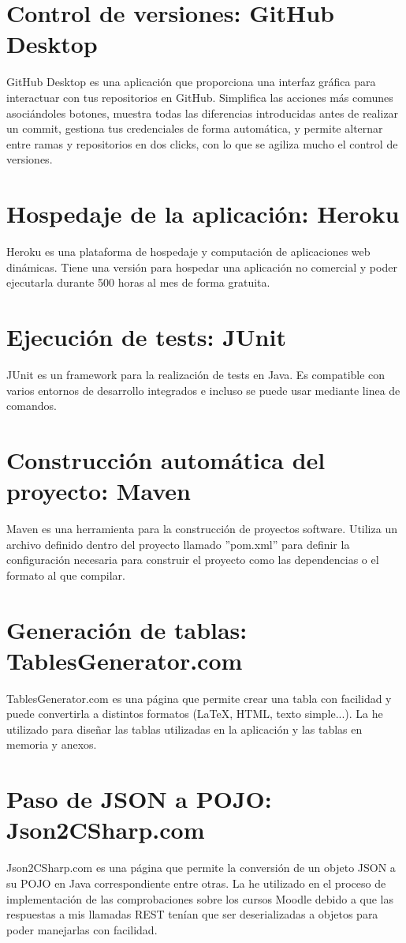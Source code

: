 \section{Control de versiones: GitHub Desktop}
GitHub Desktop es una aplicación que proporciona una interfaz gráfica para interactuar con tus repositorios en GitHub. Simplifica las acciones más comunes asociándoles botones, muestra todas las diferencias introducidas antes de realizar un commit, gestiona tus credenciales de forma automática, y permite alternar entre ramas y repositorios en dos clicks, con lo que se agiliza mucho el control de versiones.
\section{Hospedaje de la aplicación: Heroku}
Heroku es una plataforma de hospedaje y computación de aplicaciones web dinámicas. Tiene una versión para hospedar una aplicación no comercial y poder ejecutarla durante 500 horas al mes de forma gratuita.
\section{Ejecución de tests: JUnit}
JUnit es un framework para la realización de tests en Java. Es compatible con varios entornos de desarrollo integrados e incluso se puede usar mediante linea de comandos.
\section{Construcción automática del proyecto: Maven}
Maven es una herramienta para la construcción de proyectos software. Utiliza un archivo definido dentro del proyecto llamado ''pom.xml'' para definir la configuración necesaria para construir el proyecto como las dependencias o el formato al que compilar.
\section{Generación de tablas: TablesGenerator.com}
TablesGenerator.com es una página que permite crear una tabla con facilidad y puede convertirla a distintos formatos (LaTeX, HTML, texto simple...). La he utilizado para diseñar las tablas utilizadas en la aplicación y las tablas en memoria y anexos.
\section{Paso de JSON a POJO: Json2CSharp.com}
Json2CSharp.com es una página que permite la conversión de un objeto JSON a su POJO en Java correspondiente entre otras. La he utilizado en el proceso de implementación de las comprobaciones sobre los cursos Moodle debido a que las respuestas a mis llamadas REST tenían que ser deserializadas a objetos para poder manejarlas con facilidad.
